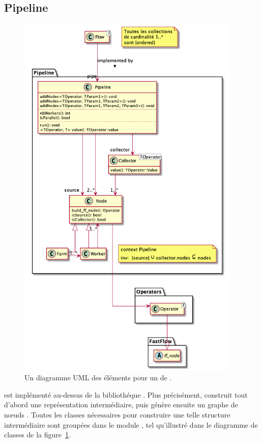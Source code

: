 \subsection{Pipeline}

\begin{figure}
\centering
         \includegraphics[width=0.95\textwidth]{Figures/pipeline.png}
      \caption{Un diagramme UML des éléments pour un  de \ppff.}
       \label{pipeline.fig}
\end{figure}

 est impl\'ement\'e au-dessus de la biblioth\'eque . Plus précisément,  construit tout d'abord une repr\'esentation interm\'ediaire, puis g\'en\`ere ensuite un graphe de n\oe{}uds . Toutes les classes n\'ecessaires pour construire une telle structure interm\'ediaire sont group\'ees dans le module , tel qu'illustr\'e dans le diagramme de classes de la figure~\ref{pipeline.fig}.

